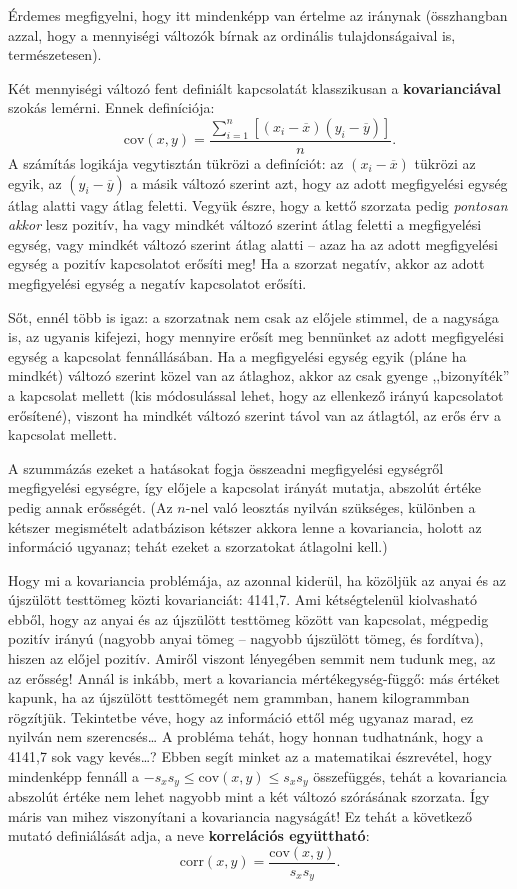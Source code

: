 \documentclass[]{book}
\begin{document}
Érdemes megfigyelni, hogy itt mindenképp van értelme az iránynak
(összhangban azzal, hogy a mennyiségi változók bírnak az ordinális
tulajdonságaival is, természetesen).

Két mennyiségi változó fent definiált kapcsolatát klasszikusan a
\textbf{kovarianciával} szokás lemérni. Ennek definíciója: \[
    \mathrm{cov}\left(x,y\right)=\frac{\sum_{i=1}^n \left[\left(x_i-\overline{x}\right)\left(y_i-\overline{y}\right)\right]}{n}.
\] A számítás logikája vegytisztán tükrözi a definíciót: az
\(\left(x_i-\overline{x}\right)\) tükrözi az egyik, az
\(\left(y_i-\overline{y}\right)\) a másik változó szerint azt, hogy az
adott megfigyelési egység átlag alatti vagy átlag feletti. Vegyük észre,
hogy a kettő szorzata pedig \emph{pontosan akkor} lesz pozitív, ha vagy
mindkét változó szerint átlag feletti a megfigyelési egység, vagy
mindkét változó szerint átlag alatti -- azaz ha az adott megfigyelési
egység a pozitív kapcsolatot erősíti meg! Ha a szorzat negatív, akkor az
adott megfigyelési egység a negatív kapcsolatot erősíti.

Sőt, ennél több is igaz: a szorzatnak nem csak az előjele stimmel, de a
nagysága is, az ugyanis kifejezi, hogy mennyire erősít meg bennünket az
adott megfigyelési egység a kapcsolat fennállásában. Ha a megfigyelési
egység egyik (pláne ha mindkét) változó szerint közel van az átlaghoz,
akkor az csak gyenge ,,bizonyíték'' a kapcsolat mellett (kis
módosulással lehet, hogy az ellenkező irányú kapcsolatot erősítené),
viszont ha mindkét változó szerint távol van az átlagtól, az erős érv a
kapcsolat mellett.

A szummázás ezeket a hatásokat fogja összeadni megfigyelési egységről
megfigyelési egységre, így előjele a kapcsolat irányát mutatja, abszolút
értéke pedig annak erősségét. (Az \(n\)-nel való leosztás nyilván
szükséges, különben a kétszer megismételt adatbázison kétszer akkora
lenne a kovariancia, holott az információ ugyanaz; tehát ezeket a
szorzatokat átlagolni kell.)

Hogy mi a kovariancia problémája, az azonnal kiderül, ha közöljük az
anyai és az újszülött testtömeg közti kovarianciát: 4141,7. Ami
kétségtelenül kiolvasható ebből, hogy az anyai és az újszülött testtömeg
között van kapcsolat, mégpedig pozitív irányú (nagyobb anyai tömeg --
nagyobb újszülött tömeg, és fordítva), hiszen az előjel pozitív. Amiről
viszont lényegében semmit nem tudunk meg, az az erősség! Annál is
inkább, mert a kovariancia mértékegység-függő: más értéket kapunk, ha az
újszülött testtömegét nem grammban, hanem kilogrammban rögzítjük.
Tekintetbe véve, hogy az információ ettől még ugyanaz marad, ez nyilván
nem szerencsés\dots{} A probléma tehát, hogy honnan tudhatnánk, hogy a
4141,7 sok vagy kevés\dots{}? Ebben segít minket az a matematikai
észrevétel, hogy mindenképp fennáll a
\(-s_x s_y \leq \mathrm{cov}\left(x,y\right) \leq s_x s_y\) összefüggés,
tehát a kovariancia abszolút értéke nem lehet nagyobb mint a két változó
szórásának szorzata. Így máris van mihez viszonyítani a kovariancia
nagyságát! Ez tehát a következő mutató definiálását adja, a neve
\textbf{korrelációs együttható}: \[
    \mathrm{corr}\left(x,y\right)=\frac{\mathrm{cov}\left(x,y\right)}{s_x s_y}.
\]
\end{document}
